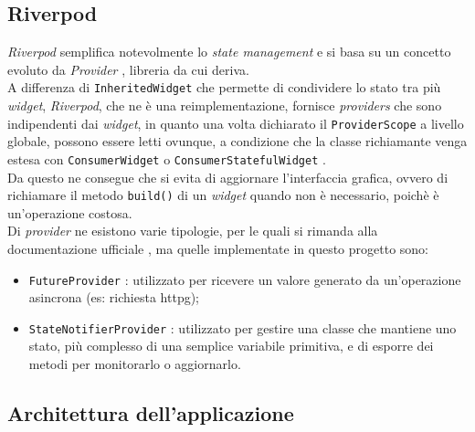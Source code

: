 \subsection{Riverpod}
\label{subsec:riverpod}

\emph{Riverpod} semplifica notevolmente lo \emph{state management} e si basa su un concetto evoluto da \emph{Provider} \cite{site:provider}, libreria da cui deriva.\\
A differenza di \lstinline{InheritedWidget} \cite{site:inheritw} che permette di condividere lo stato tra più \emph{widget}, \emph{Riverpod}, che ne è una reimplementazione, fornisce \emph{providers} che sono indipendenti dai \emph{widget}, in quanto una volta dichiarato il \lstinline{ProviderScope} a livello globale, possono essere letti ovunque, a condizione che la classe richiamante venga estesa con \lstinline{ConsumerWidget} o \lstinline{ConsumerStatefulWidget} \cite{site:reading-provider}. \\
Da questo ne consegue che si evita di aggiornare l'interfaccia grafica, ovvero di richiamare il metodo \lstinline{build()} di un \emph{widget} quando non è necessario, poichè è un'operazione costosa.\\
Di \emph{provider} ne esistono varie tipologie, per le quali si rimanda alla documentazione ufficiale \cite{site:riverpod}, ma quelle implementate in questo progetto sono:
\begin{itemize}
    \item \lstinline{FutureProvider} \cite{site:future-provider}: utilizzato per ricevere un valore generato da un'operazione asincrona (es: richiesta \gls{httpg}\glsoccur);
    \item \lstinline{StateNotifierProvider} \cite{site:state-notifier-provider}: utilizzato per gestire una classe che mantiene uno stato, più complesso di una semplice variabile primitiva, e di esporre dei metodi per monitorarlo o aggiornarlo.
\end{itemize}

\subsection{Architettura dell'applicazione}
\label{subsec:architettura-app}

